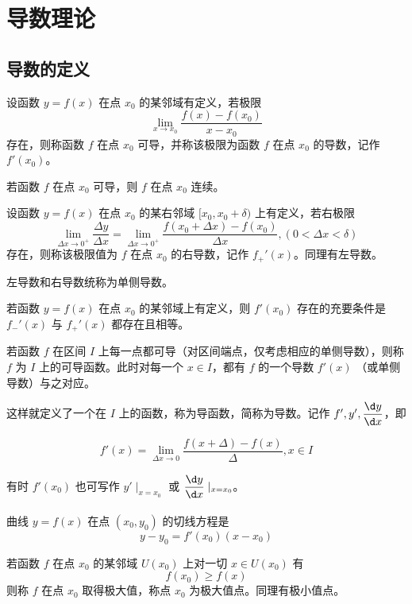 
\chapter{导数理论}

\section{导数的定义}

\begin{definition}
	设函数 $y=f(x)$ 在点 $x_0$ 的某邻域有定义，若极限
	$$\lim_{x\to x_0}\frac{f(x)-f(x_0)}{x-x_0}$$
	存在，则称函数 $f$ 在点 $x_0$ 可导，并称该极限为函数 $f$ 在点 $x_0$ 的导数，记作 $f'(x_0)$。
\end{definition}

\begin{theorem}
	若函数 $f$ 在点 $x_0$ 可导，则 $f$ 在点 $x_0$ 连续。
\end{theorem}

\begin{definition}
	设函数 $y=f(x)$ 在点 $x_0$ 的某右邻域 $[x_0,x_0+\delta)$ 上有定义，若右极限
	$$\lim_{\Delta x\to 0^+}\frac{\Delta y}{\Delta x} = \lim_{\Delta x\to 0^+}\frac{f(x_0+\Delta x)-f(x_0)}{\Delta x},(0<\Delta x<\delta)$$
	存在，则称该极限值为 $f$ 在点 $x_0$ 的右导数，记作 $f_+'(x)$。同理有左导数。
\end{definition}

左导数和右导数统称为单侧导数。

\begin{theorem}
	若函数 $y=f(x)$ 在点 $x_0$ 的某邻域上有定义，则 $f'(x_0)$ 存在的充要条件是 $f_-'(x)$ 与 $f_+'(x)$ 都存在且相等。
\end{theorem}

若函数 $f$ 在区间 $I$ 上每一点都可导（对区间端点，仅考虑相应的单侧导数），则称 $f$ 为 $I$ 上的可导函数。此时对每一个 $x\in I$，都有 $f$ 的一个导数 $f'(x)$ （或单侧导数）与之对应。

这样就定义了一个在 $I$ 上的函数，称为导函数，简称为导数。记作 $f',y',\dfrac{\d y}{\d x}$，即

$$f'(x) = \lim_{\Delta x \to 0}\frac{f(x+\Delta)-f(x)}{\Delta},x\in I$$

有时 $f'(x_0)$ 也可写作 $y'\mid_{x=x_0}$ 或 $\mfrac{\d y}{\d x}\mid_{x=x_0}$。

曲线 $y = f(x)$ 在点 $(x_0,y_0)$ 的切线方程是
$$y-y_0 = f'(x_0)(x-x_0)$$

\begin{definition}
	若函数 $f$ 在点 $x_0$ 的某邻域 $U(x_0)$ 上对一切 $x\in U(x_0)$ 有
	$$f(x_0) \geqslant f(x)$$
	则称 $f$ 在点 $x_0$ 取得极大值，称点 $x_0$ 为极大值点。同理有极小值点。
\end{definition}


